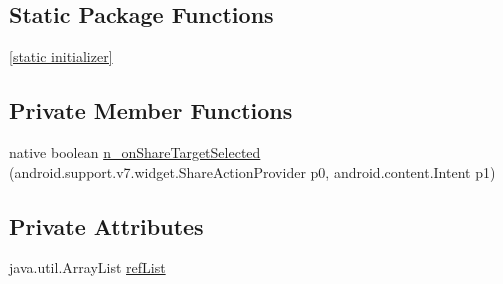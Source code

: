 \subsection*{Static Package Functions}
\begin{CompactItemize}
\item 
\hyperlink{classmono_1_1android_1_1support_1_1v7_1_1widget_1_1_share_action_provider___on_share_target_selected_listener_implementor_46d68d8f8e8e3ddecc3ebe00e1ee1c14}{\mbox{[}static initializer\mbox{]}}
\end{CompactItemize}
\subsection*{Private Member Functions}
\begin{CompactItemize}
\item 
native boolean \hyperlink{classmono_1_1android_1_1support_1_1v7_1_1widget_1_1_share_action_provider___on_share_target_selected_listener_implementor_4a6ee5e6f1e8f96d43a04d063fc4bb21}{n\_\-onShareTargetSelected} (android.support.v7.widget.ShareActionProvider p0, android.content.Intent p1)
\end{CompactItemize}
\subsection*{Private Attributes}
\begin{CompactItemize}
\item 
java.util.ArrayList \hyperlink{classmono_1_1android_1_1support_1_1v7_1_1widget_1_1_share_action_provider___on_share_target_selected_listener_implementor_7dc2c6a86e2c9e516159aa06686c618c}{refList}
\end{CompactItemize}


